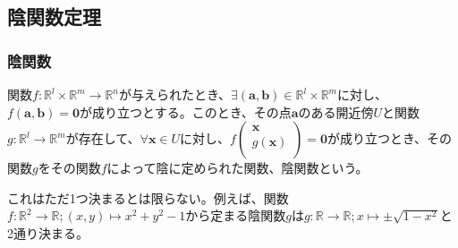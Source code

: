 \documentclass[dvipdfmx]{jsarticle}
\begin{document}
\subsection{陰関数定理}%
\subsubsection{陰関数}%
\begin{dfn}
関数$f:\mathbb{R}^{l} \times \mathbb{R}^{m} \rightarrow \mathbb{R}^{n}$が与えられたとき、$\exists\left( \mathbf{a},\mathbf{b} \right) \in \mathbb{R}^{l} \times \mathbb{R}^{m}$に対し、$f\left( \mathbf{a},\mathbf{b} \right) = \mathbf{0}$が成り立つとする。このとき、その点$\mathbf{a}$のある開近傍$U$と関数$g:\mathbb{R}^{l} \rightarrow \mathbb{R}^{m}$が存在して、$\forall\mathbf{x} \in U$に対し、$f\begin{pmatrix}
\mathbf{x} \\
g\left( \mathbf{x} \right) \\
\end{pmatrix} = \mathbf{0}$が成り立つとき、その関数$g$をその関数$f$によって陰に定められた関数、陰関数という。
\end{dfn}\par
これはただ1つ決まるとは限らない。例えば、関数$f:\mathbb{R}^{2} \rightarrow \mathbb{R};(x,y) \mapsto x^{2} + y^{2} - 1$から定まる陰関数$g$は$g:\mathbb{R} \rightarrow \mathbb{R};x \mapsto \pm \sqrt{1 - x^{2}}$と2通り決まる。
\end{document}
